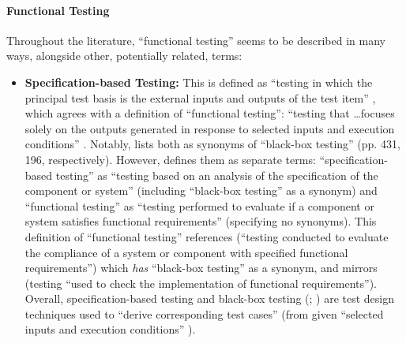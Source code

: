 \paragraph{Functional Testing}

Throughout the literature, ``functional testing'' seems to be described in many
ways, alongside other, potentially related, terms:

\begin{itemize}
      \item \textbf{Specification-based Testing:} This is defined as ``testing
            in which the principal test basis is the external inputs and
            outputs of the test item'' \citep[p.~9]{IEEE2022}, which agrees
            with a definition of ``functional testing'': ``testing that
            \dots focuses solely on the outputs generated in response to
            selected inputs and execution conditions'' \citep[p.~196]{IEEE2017}.
            Notably, \citet{IEEE2017} lists both as synonyms of
            ``black-box testing'' (pp. 431, 196, respectively). However,
            \cite{ISTQB} defines them as separate terms: ``specification-based
            testing'' as ``testing based on an analysis of the specification
            of the component or system'' (including ``black-box testing'' as a
            synonym) and ``functional testing'' as ``testing performed to
            evaluate if a component or system satisfies functional
            requirements'' (specifying no synonyms). This definition of
            ``functional testing'' references \citet[p.~196]{IEEE2017}
            (``testing conducted to evaluate the compliance of a system or
            component with specified functional requirements'') which
            \emph{has} ``black-box testing'' as a synonym, and mirrors
            \citet[p.~21]{IEEE2022} (testing ``used to check the implementation
            of functional requirements''). Overall, specification-based testing
            \citep[pp.~2-4, 6-9, 22]{IEEE2022} and black-box testing
            (\citealp[p.~88]{SWEBOK2014}; \citealp[p.~3]{SouzaEtAl2017})
            are test design techniques used to ``derive corresponding test cases''
            \citep[p.~11]{IEEE2022} (from given ``selected inputs and execution
            conditions'' \citep[p.~196]{IEEE2017}).


\end{itemize}
